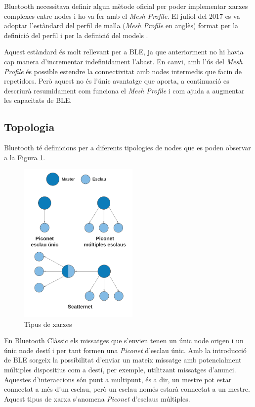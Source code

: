 Bluetooth necessitava definir algun mètode oficial per poder implementar xarxes complexes entre nodes i ho va fer amb el \textit{Mesh Profile}.
El juliol del 2017 es va adoptar l'estàndard del perfil de malla (\textit{Mesh Profile} en anglès) format per la definició del perfil \cite{Mesh Profile Definition} i per la definició del models \cite{Mesh Profile Models}.

Aquest estàndard és molt rellevant per a BLE, ja que anteriorment no hi havia cap manera d'incrementar indefinidament l'abast.
En canvi, amb l'ús del \textit{Mesh Profile} és possible estendre la connectivitat amb nodes intermedis que facin de repetidors.
Però aquest no és l'únic avantatge que aporta, a continuació es descriurà resumidament com funciona el \textit{Mesh Profile} i com ajuda a augmentar les capacitats de BLE.

\subsection{Topologia}
Bluetooth té definicions per a diferents tipologies de nodes que es poden observar a la Figura \ref{piconet}.

\begin{figure}[!h]
	\begin{center}
		\includegraphics[width=0.52\textwidth]{./images/PICONET.png}
		\caption{Tipus de xarxes}
		\label{piconet}
	\end{center}
\end{figure}

En Bluetooth Clàssic els missatges que s'envien tenen un únic node origen i un únic node destí i per tant formen una \textit{Piconet} d'esclau únic.
Amb la introducció de BLE sorgeix la possibilitat d'enviar un mateix missatge amb potencialment múltiples dispositius com a destí, per exemple, utilitzant missatges d'anunci.
Aquestes d'interaccions són punt a multipunt, és a dir, un mestre pot estar connectat a més d'un esclau, però un esclau només estarà connectat a un mestre.
Aquest tipus de xarxa s'anomena \textit{Piconet} d'esclaus múltiples.

